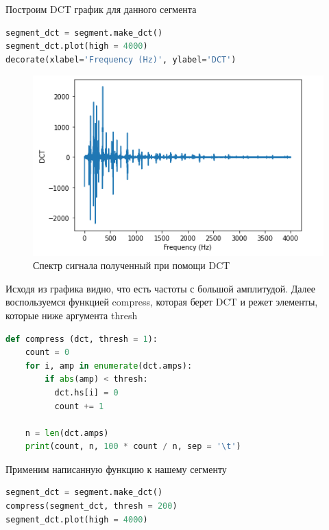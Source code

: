 Построим DCT график для данного сегмента

\begin{lstlisting}[language=Python]
segment_dct = segment.make_dct()
segment_dct.plot(high = 4000)
decorate(xlabel='Frequency (Hz)', ylabel='DCT')
\end{lstlisting}

\begin{figure}[H]
	\begin{center}
		\includegraphics[scale=1]{fig/lab06/lab06_05.png}
		\caption{Спектр сигнала полученный при помощи DCT}
	\end{center}
\end{figure}

Исходя из графика видно, что есть частоты с большой амплитудой. Далее воспользуемся функцией compress, которая берет DCT и режет элементы, которые ниже аргумента thresh

\begin{lstlisting}[language=Python]
def compress (dct, thresh = 1):
    count = 0
    for i, amp in enumerate(dct.amps):
        if abs(amp) < thresh:
          dct.hs[i] = 0
          count += 1

    n = len(dct.amps)
    print(count, n, 100 * count / n, sep = '\t')
\end{lstlisting}

Применим написанную функцию к нашему сегменту

\begin{lstlisting}[language=Python]
segment_dct = segment.make_dct()
compress(segment_dct, thresh = 200)
segment_dct.plot(high = 4000)
\end{lstlisting}

